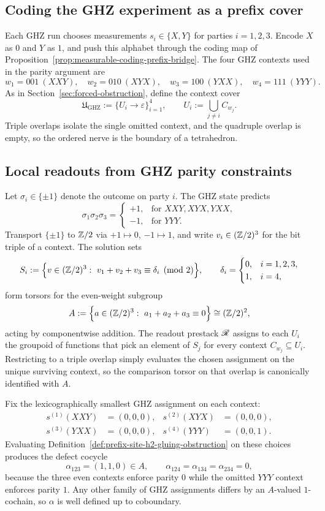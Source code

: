 \subsection{Coding the GHZ experiment as a prefix cover}

Each GHZ run chooses measurements $s_i\in\{X,Y\}$ for parties
$i=1,2,3$.  Encode $X$ as $0$ and $Y$ as $1$, and push this alphabet through
the coding map of Proposition~\ref{prop:measurable-coding-prefix-bridge}.
The four GHZ contexts used in the parity argument are
\[
w_1=001\ (XXY),\quad
w_2=010\ (XYX),\quad
w_3=100\ (YXX),\quad
w_4=111\ (YYY).
\]
As in Section~\ref{sec:forced-obstruction}, define the context cover
\[
\mathfrak{U}_{\mathrm{GHZ}}
:=\bigl\{U_i\to \varepsilon\bigr\}_{i=1}^4,
\qquad
U_i:=\bigcup_{j\ne i} C_{w_j}.
\]
Triple overlaps isolate the single omitted context, and the quadruple overlap
is empty, so the ordered nerve is the boundary of a tetrahedron.

\subsection{Local readouts from GHZ parity constraints}

Let $\sigma_i\in\{\pm 1\}$ denote the outcome on party $i$.  The GHZ state
predicts
\[
\sigma_1\sigma_2\sigma_3=
\begin{cases}
 +1,& \text{for }XXY,XYX,YXX,\\
 -1,& \text{for }YYY.
\end{cases}
\]
Transport $\{\pm1\}$ to $\mathbb{Z}/2$ via $+1\mapsto 0$, $-1\mapsto 1$, and write
$v_i\in(\mathbb{Z}/2)^3$ for the bit triple of a context.  The solution sets
\[
S_i
:=
\Bigl\{v\in(\mathbb{Z}/2)^3:\ v_1+v_2+v_3\equiv \delta_i \pmod 2\Bigr\},
\qquad
\delta_i=
\begin{cases}
0,& i=1,2,3,\\
1,& i=4,
\end{cases}
\]
form torsors for the even-weight subgroup
\[
A:=
\Bigl\{a\in(\mathbb{Z}/2)^3:\ a_1+a_2+a_3\equiv 0\Bigr\}\cong(\mathbb{Z}/2)^2,
\]
acting by componentwise addition.  The readout prestack $\mathscr{R}$ assigns to each
$U_i$ the groupoid of functions that pick an element of $S_j$ for every context
$C_{w_j}\subseteq U_i$.  Restricting to a triple overlap simply evaluates the
chosen assignment on the unique surviving context, so the comparison torsor on
that overlap is canonically identified with $A$.

Fix the lexicographically smallest GHZ assignment on each context:
\[
\begin{aligned}
s^{(1)}(XXY)&=(0,0,0),&
s^{(2)}(XYX)&=(0,0,0),\\
s^{(3)}(YXX)&=(0,0,0),&
s^{(4)}(YYY)&=(0,0,1).
\end{aligned}
\]
Evaluating
Definition~\ref{def:prefix-site-h2-gluing-obstruction} on these choices produces
the defect cocycle
\[
\alpha_{123}=(1,1,0)\in A,
\qquad
\alpha_{124}=\alpha_{134}=\alpha_{234}=0,
\]
because the three even contexts enforce parity $0$ while the omitted $YYY$
context enforces parity $1$.  Any other family of GHZ assignments differs by an
$A$-valued $1$-cochain, so $\alpha$ is well defined up to coboundary.


